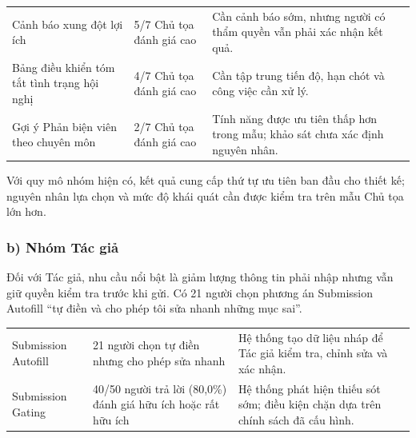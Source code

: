 \begin{center}
\setlength{\tabcolsep}{2pt}
\renewcommand{\arraystretch}{1.15}
\begin{tabular}{|P{0.31\textwidth}|P{0.31\textwidth}|P{0.31\textwidth}|}
\hline
{} &  &  \\ \hline
Cảnh báo xung đột lợi ích & 5/7 Chủ tọa đánh giá cao & Cần cảnh báo sớm, nhưng người có thẩm quyền vẫn phải xác nhận kết quả. \\ \hline
Bảng điều khiển tóm tắt tình trạng hội nghị & 4/7 Chủ tọa đánh giá cao & Cần tập trung tiến độ, hạn chót và công việc cần xử lý. \\ \hline
Gợi ý Phản biện viên theo chuyên môn & 2/7 Chủ tọa đánh giá cao & Tính năng được ưu tiên thấp hơn trong mẫu; khảo sát chưa xác định nguyên nhân. \\ \hline
\end{tabular}
\end{center}

Với quy mô nhóm hiện có, kết quả cung cấp thứ tự ưu tiên ban đầu cho thiết kế; nguyên nhân lựa chọn và mức độ khái quát cần được kiểm tra trên mẫu Chủ tọa lớn hơn.

\subsubsection{b) Nhóm Tác giả}

Đối với Tác giả, nhu cầu nổi bật là giảm lượng thông tin phải nhập nhưng vẫn giữ quyền kiểm tra trước khi gửi. Có 21 người chọn phương án Submission Autofill ``tự điền và cho phép tôi sửa nhanh những mục sai''.

\begin{center}
\setlength{\tabcolsep}{2pt}
\renewcommand{\arraystretch}{1.15}
\begin{tabular}{|P{0.31\textwidth}|P{0.31\textwidth}|P{0.31\textwidth}|}
\hline
{} &  &  \\ \hline
Submission Autofill & 21 người chọn tự điền nhưng cho phép sửa nhanh & Hệ thống tạo dữ liệu nháp để Tác giả kiểm tra, chỉnh sửa và xác nhận. \\ \hline
Submission Gating & 40/50 người trả lời (80,0\%) đánh giá hữu ích hoặc rất hữu ích & Hệ thống phát hiện thiếu sót sớm; điều kiện chặn dựa trên chính sách đã cấu hình. \\ \hline
\end{tabular}
\end{center}

